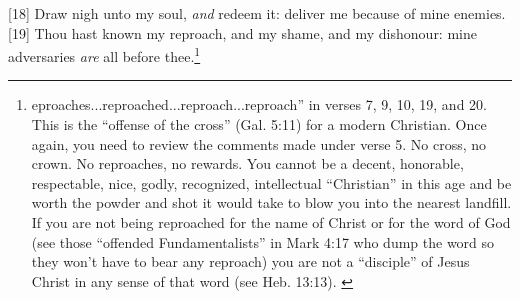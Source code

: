 [18] \textcolor[rgb]{0.00,0.00,1.00}{Draw nigh unto my soul, \emph{and} redeem it: deliver me because of mine enemies.}
[19] \textcolor[rgb]{0.00,0.00,1.00}{Thou hast known my reproach, and my shame, and my dishonour: mine adversaries \emph{are} all before thee.}\footnote{eproaches...reproached...reproach...reproach” in verses 7, 9, 10, 19, and 20. This is the “offense of the cross” (Gal. 5:11) for a modern Christian. Once again, you need to review the comments made under verse 5. No cross, no crown. No reproaches, no rewards. You cannot be a decent, honorable, respectable, nice, godly, recognized, intellectual “Christian” in this age and be worth the powder and shot it would take to blow you into the nearest landfill. If you are not being reproached for the name of Christ or for the word of God (see those  “offended Fundamentalists” in Mark 4:17 who dump the word so they won’t have to bear any reproach) you are not a “disciple” of Jesus Christ in any sense of that word (see Heb. 13:13). \cite{Ruckman1992Psalms}  }
